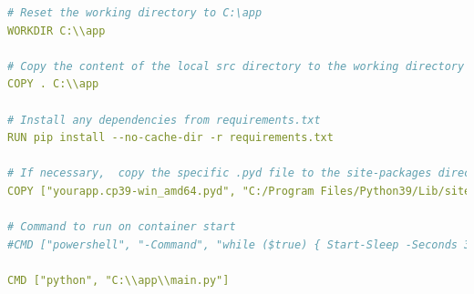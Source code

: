 \documentclass{article}
\begin{document}
\begin{lstlisting}[language=yaml]
# Reset the working directory to C:\app
WORKDIR C:\\app

# Copy the content of the local src directory to the working directory
COPY . C:\\app

# Install any dependencies from requirements.txt
RUN pip install --no-cache-dir -r requirements.txt

# If necessary,  copy the specific .pyd file to the site-packages directory
COPY ["yourapp.cp39-win_amd64.pyd", "C:/Program Files/Python39/Lib/site-packages/"]

# Command to run on container start
#CMD ["powershell", "-Command", "while ($true) { Start-Sleep -Seconds 3600 }"]

CMD ["python", "C:\\app\\main.py"]
\end{lstlisting}
\end{document}
